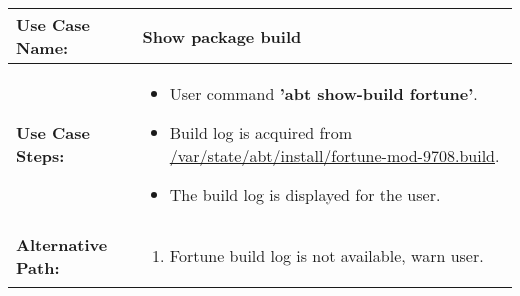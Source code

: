 \medskip

\begin{tabularx}{\linewidth}{|l|X|}
\hline
\textbf{Use Case Name:} & \textbf{Show package build} \\
\hline
\textbf{Use Case Steps:} & 
\begin{minipage}{\linewidth} 
  \vspace{0.05em}
  \begin{itemize}
    \item User command \textbf{'abt show-build fortune'}.
    \item Build log is acquired from \url{/var/state/abt/install/fortune-mod-9708.build}.
    \item The build log is displayed for the user.
  \end{itemize}
  \vspace{0.05em}
\end{minipage}
\\
\hline 
\textbf{Alternative Path:} &
\begin{minipage}{\linewidth}
  \vspace{0.05em} 
  \begin{enumerate}
    \item Fortune build log is not available, warn user.
  \end{enumerate}
  \vspace{0.05em} 
\end{minipage}
\\
\hline
\end{tabularx}